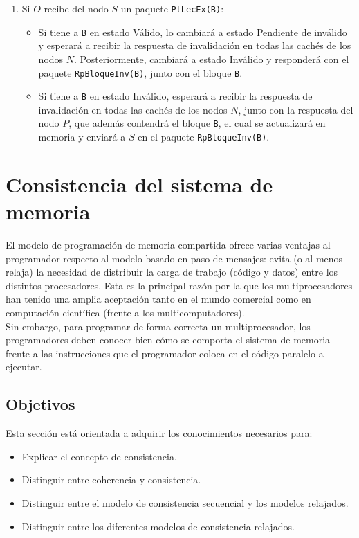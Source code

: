 \begin{enumerate}
\begin{enumerate}
\begin{itemize}
            \end{itemize}
        \item Si $O$ recibe del nodo $S$ un paquete \verb|PtLecEx(B)|:
            \begin{itemize}
                \item Si tiene a \verb|B| en estado Válido, lo cambiará a estado Pendiente de inválido y esperará a recibir la respuesta de invalidación en todas las cachés de los nodos $N$. Posteriormente, cambiará a estado Inválido y responderá con el paquete \verb|RpBloqueInv(B)|, junto con el bloque \verb|B|.
                \item Si tiene a \verb|B| en estado Inválido, esperará a recibir la respuesta de invalidación en todas las cachés de los nodos $N$, junto con la respuesta del nodo $P$, que además contendrá el bloque \verb|B|, el cual se actualizará en memoria y enviará a $S$ en el paquete \verb|RpBloqueInv(B)|.
            \end{itemize}
    \end{enumerate}
\end{enumerate}

\newpage
\section{Consistencia del sistema de memoria}
El modelo de programación de memoria compartida ofrece varias ventajas al programador respecto al modelo basado en paso de mensajes: evita (o al menos relaja) la necesidad de distribuir la carga de trabajo (código y datos) entre los distintos procesadores. Esta es la principal razón por la que los multiprocesadores han tenido una amplia aceptación tanto en el mundo comercial como en computación científica (frente a los multicomputadores).\\

Sin embargo, para programar de forma correcta un multiprocesador, los programadores deben conocer bien cómo se comporta el sistema de memoria frente a las instrucciones que el programador coloca en el código paralelo a ejecutar.

\subsection{Objetivos}
Esta sección está orientada a adquirir los conocimientos necesarios para:
\begin{itemize}
    \item Explicar el concepto de consistencia.
    \item Distinguir entre coherencia y consistencia.
    \item Distinguir entre el modelo de consistencia secuencial y los modelos relajados.
    \item Distinguir entre los diferentes modelos de consistencia relajados.
\end{itemize}

